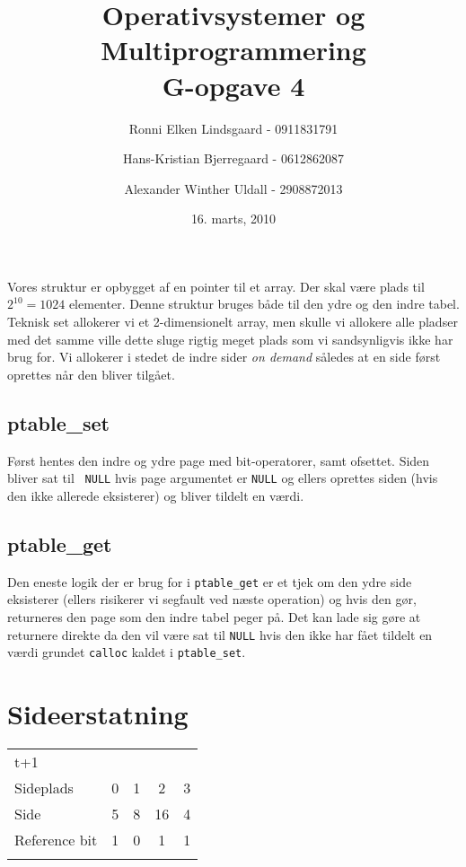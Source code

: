 \documentclass[titlepage]{article}
\title{Operativsystemer og Multiprogrammering\\G-opgave 4}
\author{Ronni Elken Lindsgaard - 0911831791 \and
Hans-Kristian Bjerregaard - 0612862087 \and
Alexander Winther Uldall - 2908872013}
\date{16. marts, 2010}
\begin{document}
\maketitle
\newpage
\section{}
Vores struktur er opbygget af en pointer til et array. Der skal være plads til $2^{10} = 1024$
elementer. Denne struktur bruges både til den ydre og den indre tabel. Teknisk set allokerer vi et
2-dimensionelt array, men skulle vi allokere alle pladser med det samme ville dette sluge rigtig
meget plads som vi sandsynligvis ikke har brug for. Vi allokerer i stedet de indre sider {\it on
demand} således at en side først oprettes når den bliver tilgået.

\subsection{ptable\_set}
Først hentes den indre og ydre page med bit-operatorer, samt ofsettet. Siden bliver sat til {\tt
NULL} hvis page argumentet er {\tt NULL} og ellers oprettes siden (hvis den ikke allerede
eksisterer) og bliver tildelt en værdi.
\subsection{ptable\_get}
Den eneste logik der er brug for i {\tt ptable\_get} er et tjek om den ydre side eksisterer (ellers
risikerer vi segfault ved næste operation) og hvis den gør, returneres den page som den indre tabel
peger på. Det kan lade sig gøre at returnere direkte da den vil være sat til {\tt NULL} hvis den
ikke har fået tildelt en værdi grundet {\tt calloc} kaldet i {\tt ptable\_set}.
\subsection{}
\section{Sideerstatning}

\begin{tabular}{l | c | c | c | c}

t+1\\
Sideplads    & 0 & 1 & 2 & 3\\
Side         & 5 & 8 & 16 & 4\\
Reference bit & 1 & 0 & 1 & 1\\\\  
\end{tabular}
\end{document}
